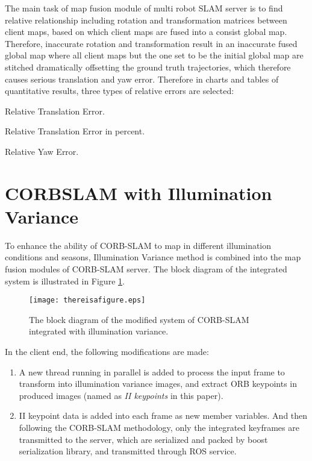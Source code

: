 The main task of map fusion module of multi robot SLAM server is to find relative relationship including rotation and transformation matrices between client maps, based on which client maps are fused into a consist global map. Therefore, inaccurate rotation and transformation result in an inaccurate fused global map where all client maps but the one set to be the initial global map are stitched dramatically offsetting the ground truth trajectories, which therefore causes serious translation and yaw error. Therefore in charts and tables of quantitative results, three types of relative errors are selected: 
\begin{inparaenum}
	\item Relative Translation Error. \item Relative Translation Error in percent.  \item Relative Yaw Error.
\end{inparaenum}


\section{CORBSLAM with Illumination Variance}

To enhance the ability of CORB-SLAM to map in different illumination conditions and seasons, Illumination Variance method is combined into the map fusion modules of CORB-SLAM server. The block diagram of the integrated system is illustrated in Figure \ref{fig:coislamoverview}.

\begin{figure}[H]
	\centering
	\texttt{[image: thereisafigure.eps]}
	\caption{The block diagram of the modified system of CORB-SLAM integrated with illumination variance.}
	\label{fig:coislamoverview} 
\end{figure}

In the client end, the following modifications are made:

\begin{enumerate}
	\item A new thread running in parallel is added to process the input frame to transform into illumination variance images, and extract ORB keypoints in produced images (named as \textsl{II keypoints} in this paper).
	\item II keypoint data is added into each frame as new member variables. And then following the CORB-SLAM methodology, only the integrated keyframes are transmitted to the server,  which are serialized and packed by boost serialization library, and transmitted through ROS service.
\end{enumerate}

